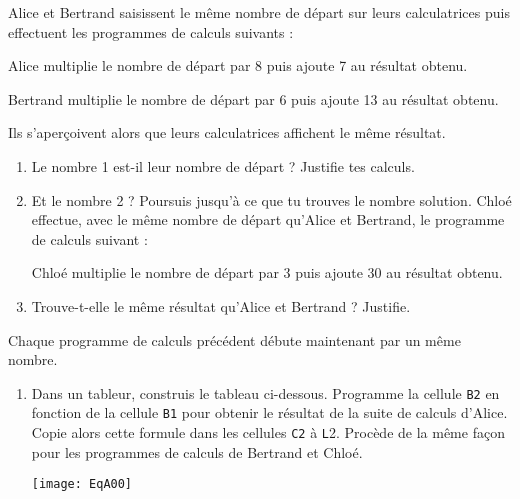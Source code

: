 \begin{activite}\label{EQactiTtPrgm}

\begin{partie}\label{EQacti3progs}




Alice et Bertrand saisissent le même nombre de départ sur leurs calculatrices puis effectuent les programmes de calculs suivants : 

\begin{cadre}
Alice multiplie le nombre de départ par 8 puis ajoute 7 au résultat obtenu.
\end{cadre}

\begin{cadre}
Bertrand multiplie le nombre de départ par 6 puis ajoute 13 au résultat obtenu.
\end{cadre}
Ils s'aperçoivent alors que leurs calculatrices affichent le même résultat.
\begin{enumerate}
\item Le nombre 1 est-il leur nombre de départ ? Justifie tes calculs.
\item \label{EQact01} Et le nombre 2 ? Poursuis jusqu'à ce que tu trouves le nombre solution.
Chloé effectue, avec le même nombre de départ qu'Alice et Bertrand, le programme de calculs suivant : 
\begin{cadre}
Chloé multiplie le nombre de départ par 3 puis ajoute 30 au résultat obtenu.
\end{cadre}
\item Trouve-t-elle le même résultat qu'Alice et Bertrand ? Justifie.
\end{enumerate}
\end{partie}


\begin{partie}
Chaque programme de calculs précédent débute maintenant par un même nombre.
\begin{enumerate}
\item Dans un tableur, construis le tableau ci-dessous. Programme la cellule \texttt{B2} en fonction de la cellule \texttt{B1} pour obtenir le résultat de la suite de calculs d'Alice. Copie alors cette formule dans les cellules \texttt{C2} à \texttt{L}2. 
Procède de la même façon pour les programmes de calculs de Bertrand et Chloé. 

\vspace{1em}

\texttt{[image: EqA00]}


\end{enumerate}
\end{partie}
\end{activite}
